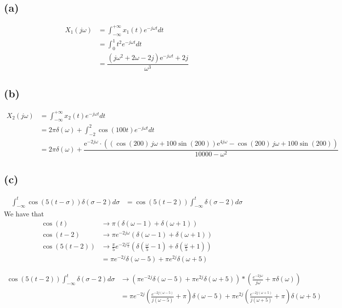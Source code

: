 \documentclass[12pt]{article}
\begin{document}
\subsection*{(a)}
\begin{align*}
X_1(j\omega)&=\int_{-\infty}^{+\infty} x_1(t)e^{-j\omega t}dt\\
&=\int_{0}^{1}t^2e^{-j\omega t}dt\\
&=\dfrac{\left(j{\omega}^2+2{\omega}-2j\right)\mathrm{e}^{-j{\omega}t}+2j}{{\omega}^3}
\end{align*}
\subsection*{(b)}
\begin{align*}
X_2(j\omega)&=\int_{-\infty}^{+\infty} x_2(t)e^{-j\omega t}dt\\
&=2\pi\delta(\omega)+\int_{-2}^{2}\cos(100t)e^{-j\omega t}dt\\
&=2\pi\delta(\omega)+\dfrac{\mathrm{e}^{-2j{\omega}}\cdot\left(\left(\cos\left(200\right)\,j{\omega}+100\sin\left(200\right)\right)\mathrm{e}^{4j{\omega}}-\cos\left(200\right)\,j{\omega}+100\sin\left(200\right)\right)}{10000-{\omega}^2}
\end{align*}
\subsection*{(c)}
\begin{align*}
\int_{-\infty}^t \cos(5(t-\sigma))\delta(\sigma-2)d\sigma &= \cos(5(t-2))\int_{-\infty}^t\delta(\sigma-2)d\sigma
\end{align*}
We have that
\begin{align*}
\cos(t)&\to \pi (\delta (\omega-1)+\delta(\omega+1))\\
\cos(t-2)&\to \pi e^{-2j\omega} (\delta (\omega-1)+\delta(\omega+1))\\
\cos(5(t-2))&\to \frac{\pi}{5} e^{-2j\frac{\omega}{5}} (\delta (\frac{\omega}{5}-1)+\delta(\frac{\omega}{5}+1))\\
&=\pi e^{-2j}\delta (\omega-5)+\pi e^{2j}\delta (\omega+5)
\end{align*}

\begin{align*}
\cos(5(t-2))\int_{-\infty}^t\delta(\sigma-2)d\sigma&\to \left(\pi e^{-2j}\delta (\omega-5)+\pi e^{2j}\delta (\omega+5)\right)*\left(\frac{e^{-2j\omega}}{j\omega}+\pi \delta(\omega)\right)\\
&=\pi e^{-2j}\left(\frac{e^{-2j(\omega-5)}}{j(\omega-5)}+\pi\right)\delta (\omega-5)+\pi e^{2j}\left(\frac{e^{-2j(\omega+5)}}{j(\omega+5)}+\pi\right)\delta (\omega+5)
\end{align*}
\end{document}
